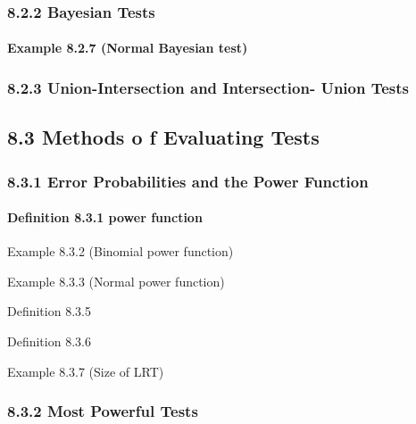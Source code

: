 \documentclass[6pt,twocolumn,Portrait]{article}
\let\oldparagraph\paragraph
\renewcommand{\paragraph}[1]{\oldparagraph{#1}\mbox{}}
\begin{document}
\hypertarget{BayesT}{%
\subsubsection{8.2.2 Bayesian Tests}\label{BayesT}}

\hypertarget{Norm-Bayes}{%
\paragraph{\texorpdfstring{\textbf{Example 8.2.7 (Normal Bayesian
test)}}{Example 8.2.7 (Normal Bayesian test)}}\label{Norm-Bayes}}

\hypertarget{union-intersection-and-intersection--union-tests}{%
\subsubsection{8.2.3 Union-Intersection and Intersection- Union
Tests}\label{union-intersection-and-intersection--union-tests}}

\hypertarget{methods-o-f-evaluating-tests}{%
\subsection{8.3 Methods o f Evaluating
Tests}\label{methods-o-f-evaluating-tests}}

\hypertarget{error-probabilities-and-the-power-function}{%
\subsubsection{8.3.1 Error Probabilities and the Power
Function}\label{error-probabilities-and-the-power-function}}

\hypertarget{power}{%
\paragraph{\texorpdfstring{\textbf{Definition 8.3.1 power
function}}{Definition 8.3.1 power function}}\label{power}}

Example 8.3.2 (Binomial power function)

Example 8.3.3 (Normal power function)

Definition 8.3.5

Definition 8.3.6

Example 8.3.7 (Size of LRT)

\hypertarget{most-powerful-tests}{%
\subsubsection{8.3.2 Most Powerful Tests}\label{most-powerful-tests}}
\end{document}
